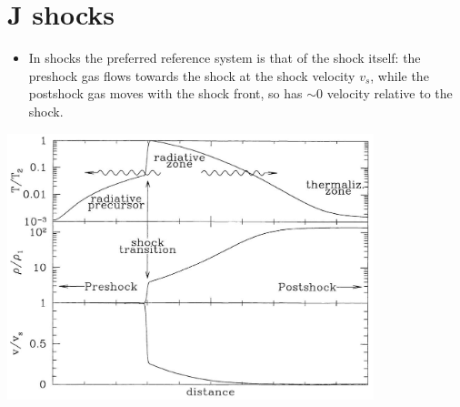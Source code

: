 \section{J shocks} \label{item:Jschocks}


\begin{frame}{}


\begin{itemize}

\item In shocks the preferred reference system is that of the shock
  itself: the preshock gas flows towards the shock at the shock
  velocity $v_s$, while the postshock gas moves with the shock front,
  so has $\sim 0$ velocity relative to the shock. 


\end{itemize}

\begin{center}
  \includegraphics[width=0.8\textwidth,height=!]{./E/fig_Jshocks.jpg}
\end{center}


\end{frame}



